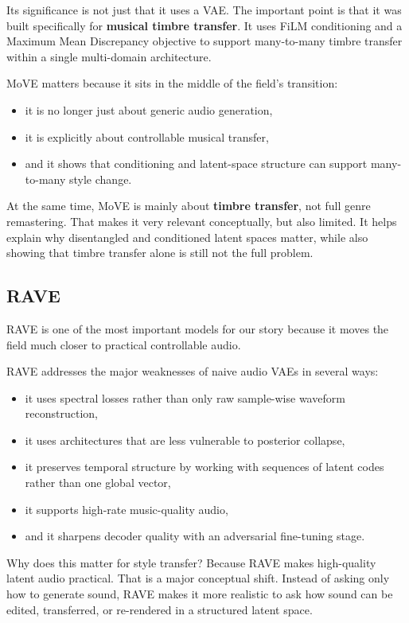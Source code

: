 \documentclass[11pt]{article}
\begin{document}
Its significance is not just that it uses a VAE. The important point is that it was built specifically for \textbf{musical timbre transfer}. It uses FiLM conditioning and a Maximum Mean Discrepancy objective to support many-to-many timbre transfer within a single multi-domain architecture.

MoVE matters because it sits in the middle of the field's transition:

\begin{itemize}
\item it is no longer just about generic audio generation,
\item it is explicitly about controllable musical transfer,
\item and it shows that conditioning and latent-space structure can support many-to-many style change.
\end{itemize}

At the same time, MoVE is mainly about \textbf{timbre transfer}, not full genre remastering. That makes it very relevant conceptually, but also limited. It helps explain why disentangled and conditioned latent spaces matter, while also showing that timbre transfer alone is still not the full problem.

\subsection{RAVE}

RAVE is one of the most important models for our story because it moves the field much closer to practical controllable audio.

RAVE addresses the major weaknesses of naive audio VAEs in several ways:

\begin{itemize}
\item it uses spectral losses rather than only raw sample-wise waveform reconstruction,
\item it uses architectures that are less vulnerable to posterior collapse,
\item it preserves temporal structure by working with sequences of latent codes rather than one global vector,
\item it supports high-rate music-quality audio,
\item and it sharpens decoder quality with an adversarial fine-tuning stage.
\end{itemize}

Why does this matter for style transfer? Because RAVE makes high-quality latent audio practical. That is a major conceptual shift. Instead of asking only how to generate sound, RAVE makes it more realistic to ask how sound can be edited, transferred, or re-rendered in a structured latent space.
\end{document}

